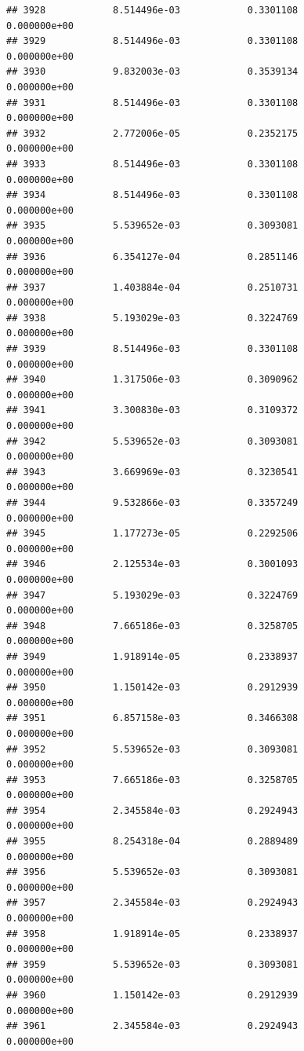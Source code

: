 \documentclass[
]{article}
\begin{document}
\begin{verbatim}
## 3928            8.514496e-03            0.3301108            0.000000e+00
## 3929            8.514496e-03            0.3301108            0.000000e+00
## 3930            9.832003e-03            0.3539134            0.000000e+00
## 3931            8.514496e-03            0.3301108            0.000000e+00
## 3932            2.772006e-05            0.2352175            0.000000e+00
## 3933            8.514496e-03            0.3301108            0.000000e+00
## 3934            8.514496e-03            0.3301108            0.000000e+00
## 3935            5.539652e-03            0.3093081            0.000000e+00
## 3936            6.354127e-04            0.2851146            0.000000e+00
## 3937            1.403884e-04            0.2510731            0.000000e+00
## 3938            5.193029e-03            0.3224769            0.000000e+00
## 3939            8.514496e-03            0.3301108            0.000000e+00
## 3940            1.317506e-03            0.3090962            0.000000e+00
## 3941            3.300830e-03            0.3109372            0.000000e+00
## 3942            5.539652e-03            0.3093081            0.000000e+00
## 3943            3.669969e-03            0.3230541            0.000000e+00
## 3944            9.532866e-03            0.3357249            0.000000e+00
## 3945            1.177273e-05            0.2292506            0.000000e+00
## 3946            2.125534e-03            0.3001093            0.000000e+00
## 3947            5.193029e-03            0.3224769            0.000000e+00
## 3948            7.665186e-03            0.3258705            0.000000e+00
## 3949            1.918914e-05            0.2338937            0.000000e+00
## 3950            1.150142e-03            0.2912939            0.000000e+00
## 3951            6.857158e-03            0.3466308            0.000000e+00
## 3952            5.539652e-03            0.3093081            0.000000e+00
## 3953            7.665186e-03            0.3258705            0.000000e+00
## 3954            2.345584e-03            0.2924943            0.000000e+00
## 3955            8.254318e-04            0.2889489            0.000000e+00
## 3956            5.539652e-03            0.3093081            0.000000e+00
## 3957            2.345584e-03            0.2924943            0.000000e+00
## 3958            1.918914e-05            0.2338937            0.000000e+00
## 3959            5.539652e-03            0.3093081            0.000000e+00
## 3960            1.150142e-03            0.2912939            0.000000e+00
## 3961            2.345584e-03            0.2924943            0.000000e+00

\end{verbatim}
\end{document}
